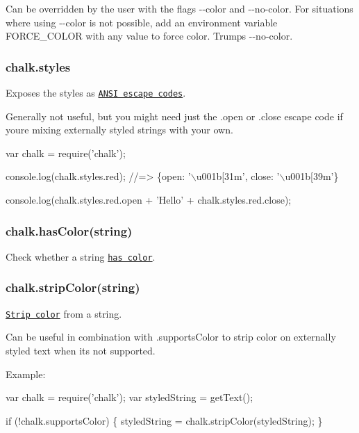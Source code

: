 Can be overridden by the user with the flags {\ttfamily -\/-\/color} and {\ttfamily -\/-\/no-\/color}. For situations where using {\ttfamily -\/-\/color} is not possible, add an environment variable {\ttfamily F\+O\+R\+C\+E\+\_\+\+C\+O\+L\+O\+R} with any value to force color. Trumps {\ttfamily -\/-\/no-\/color}.

\subsubsection*{chalk.\+styles}

Exposes the styles as \href{https://github.com/sindresorhus/ansi-styles}{\tt A\+N\+S\+I escape codes}.

Generally not useful, but you might need just the {\ttfamily .open} or {\ttfamily .close} escape code if you\textquotesingle{}re mixing externally styled strings with your own.


\begin{DoxyCode}
var chalk = require(\textcolor{stringliteral}{'chalk'});

console.log(chalk.styles.red);
\textcolor{comment}{//=> \{open: '\(\backslash\)u001b[31m', close: '\(\backslash\)u001b[39m'\}}

console.log(chalk.styles.red.open + \textcolor{stringliteral}{'Hello'} + chalk.styles.red.close);
\end{DoxyCode}


\subsubsection*{chalk.\+has\+Color(string)}

Check whether a string \href{https://github.com/sindresorhus/has-ansi}{\tt has color}.

\subsubsection*{chalk.\+strip\+Color(string)}

\href{https://github.com/sindresorhus/strip-ansi}{\tt Strip color} from a string.

Can be useful in combination with {\ttfamily .supports\+Color} to strip color on externally styled text when it\textquotesingle{}s not supported.

Example\+:


\begin{DoxyCode}
var chalk = require(\textcolor{stringliteral}{'chalk'});
var styledString = getText();

\textcolor{keywordflow}{if} (!chalk.supportsColor) \{
    styledString = chalk.stripColor(styledString);
\}
\end{DoxyCode}


